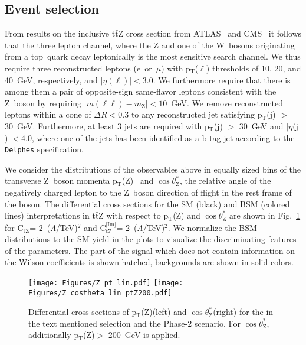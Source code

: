 \documentclass[letterpaper,11pt]{article}
\def\PZ{Z\xspace}
\def\PW{W\xspace}
\def\Pl{\ell}
\def\jet{j}
\def\ttZ{t$\bar{\text{t}}$Z\xspace}
\def\pT{p$_\text{T}$}
\def\pTZ{p$_\text{T}$(Z)\xspace}
\def\cosThetaStar{$\cos\theta^*_\text{Z}$\xspace}
\def\ctZ{C$_\text{tZ}$\xspace}
\def\ctZI{C$_\text{tZ}^\text{[Im]}$\xspace}
\def\delphes{\texttt{Delphes}\xspace}
\def\TeV{TeV\xspace}
\def\GeV{GeV\xspace}
\begin{document}
\subsection{Event selection}
\label{sec:selection}
From results on the inclusive \ttZ cross section from ATLAS~\cite{Aad:2015eua,ATLAS:2016ttVarticles} and CMS~\cite{PRL-110-172002,EPJC-C74-2014-9,JHEP-1601-2016-096,Sirunyan:2017uzs} it follows that the three lepton channel, where the \PZ and one of the \PW~bosons originating from a top~quark decay leptonically is the most sensitive search channel.
We thus require three reconstructed leptons (e~or~$\mu$) with \pT($\Pl$) thresholds of 10, 20, and 40~\GeV, respectively, and $|\eta(\Pl)|<3.0$.
We furthermore require that there is among them a pair of opposite-sign same-flavor leptons consistent with the \PZ~boson by requiring $|m(\Pl\Pl)-m_\text{\PZ}|<10$~\GeV.
We remove reconstructed leptons within a cone of $\Delta R < 0.3$ to any reconstructed jet satisfying \pT(\jet) $>$ 30~\GeV.
Furthermore, at least 3 jets are required with \pT(\jet) $>$ 30~\GeV and $|\eta($\jet$)|<4.0$, where one of the jets has been identified as a b-tag jet according to the \delphes specification.

\noindent
We consider the distributions of the observables above in equally sized bins of the transverse \PZ~boson momenta \pTZ~\cite{Rontsch:2014cca} and \cosThetaStar, the relative angle of the negatively charged lepton to the \PZ~boson direction of flight in the rest frame of the boson.
The differential cross sections for the SM (black) and BSM (colored lines) interpretations in \ttZ with respect to \pTZ and \cosThetaStar are shown in Fig.~\ref{fig:ttZ_pt_cos} for \ctZ = 2~($\Lambda$/\TeV)$^2$ and \ctZI = 2~($\Lambda$/\TeV)$^2$.
We normalize the BSM distributions to the SM yield in the plots to visualize the discriminating features of the parameters.
The part of the signal which does not contain information on the Wilson coefficients is shown hatched, backgrounds are shown in solid colors.

\begin{figure}[tbp]
  \centering
    \texttt{[image: Figures/Z\_pt\_lin.pdf]}
    \hspace{1.7cm}
    \texttt{[image: Figures/Z\_costheta\_lin\_ptZ200.pdf]}
    \hspace{.3cm}
\caption{
Differential cross sections of \pTZ (left) and \cosThetaStar (right) for the in the text mentioned selection and the Phase-2 scenario.
For \cosThetaStar, additionally \pTZ $>$ 200~\GeV is applied. 
}\label{fig:ttZ_pt_cos}
\end{figure}
\end{document}
